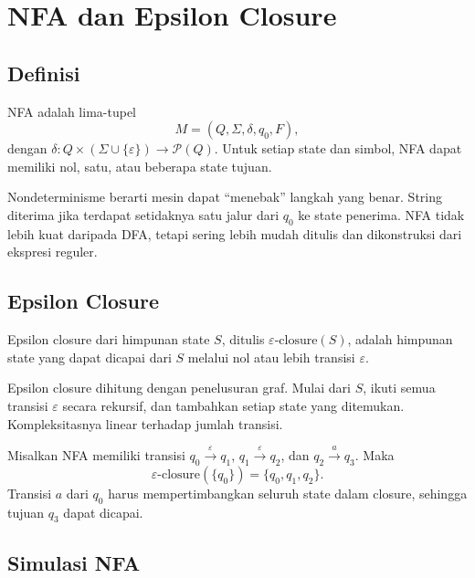 \section{NFA dan Epsilon Closure}
\label{sec:ch06-nfa}

\subsection{Definisi}

\begin{definisi}
NFA adalah lima-tupel
\[
M = (Q, \Sigma, \delta, q_0, F),
\]
dengan \(\delta : Q \times (\Sigma \cup \{\varepsilon\}) \to
\mathcal{P}(Q)\). Untuk setiap state dan simbol, NFA dapat memiliki
nol, satu, atau beberapa state tujuan.
\end{definisi}

Nondeterminisme berarti mesin dapat ``menebak'' langkah yang benar.
String diterima jika terdapat setidaknya satu jalur dari \(q_0\) ke
state penerima. NFA tidak lebih kuat daripada DFA, tetapi sering
lebih mudah ditulis dan dikonstruksi dari ekspresi reguler.

\subsection{Epsilon Closure}

\begin{definisi}
Epsilon closure dari himpunan state \(S\), ditulis
\(\varepsilon\text{-closure}(S)\), adalah himpunan state yang dapat
dicapai dari \(S\) melalui nol atau lebih transisi \(\varepsilon\).
\end{definisi}

Epsilon closure dihitung dengan penelusuran graf. Mulai dari \(S\),
ikuti semua transisi \(\varepsilon\) secara rekursif, dan tambahkan
setiap state yang ditemukan. Kompleksitasnya linear terhadap jumlah
transisi.

\begin{contoh}
Misalkan NFA memiliki transisi
\(q_0 \xrightarrow{\varepsilon} q_1\),
\(q_1 \xrightarrow{\varepsilon} q_2\), dan
\(q_2 \xrightarrow{a} q_3\). Maka
\[
\varepsilon\text{-closure}(\{q_0\}) = \{q_0, q_1, q_2\}.
\]
Transisi \(a\) dari \(q_0\) harus mempertimbangkan seluruh state
dalam closure, sehingga tujuan \(q_3\) dapat dicapai.
\end{contoh}

\subsection{Simulasi NFA}

